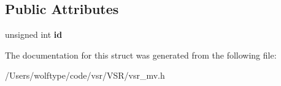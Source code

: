 \subsection*{Public Attributes}
\begin{DoxyCompactItemize}
\item 
\hypertarget{structvsr_1_1_generic_af8357122e6d1d6dcae582e058a32271b}{unsigned int {\bfseries id}}\label{structvsr_1_1_generic_af8357122e6d1d6dcae582e058a32271b}

\end{DoxyCompactItemize}


The documentation for this struct was generated from the following file\-:\begin{DoxyCompactItemize}
\item 
/\-Users/wolftype/code/vsr/\-V\-S\-R/vsr\-\_\-mv.\-h\end{DoxyCompactItemize}
